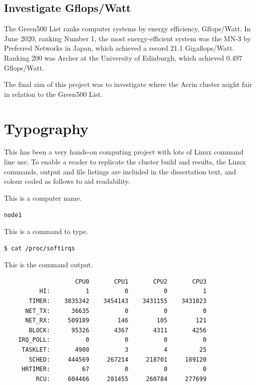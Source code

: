 \documentclass{report}
\begin{document}
%
%
\subsection{Investigate Gflops/Watt}

The Green500 List ranks computer systems by energy efficiency, Gflops/Watt. In June 2020, ranking Number 1, the most energy-efficient system was the MN-3 by Preferred Networks in Japan, which achieved a record 21.1 Gigaflops/Watt. Ranking 200 was Archer at the University of Edinburgh, which achieved 0.497 Gflops/Watt.

The final aim of this project was to investigate where the Aerin cluster might fair in relation to the Green500 List. 


%
%
\section{Typography}

This has been a very hands-on computing project with lots of Linux command line use. To enable a reader to replicate the cluster build and results, the Linux commands, output and file listings are included in the dissertation text, and colour coded as follows to aid readability.

This is a computer name.

\verb|node1|

This is a command to type.

\lstset{style=type}
\begin{lstlisting}[]
$ cat /proc/softirqs
\end{lstlisting}


This is the command output.

\lstset{style=term}
\begin{lstlisting}
                    CPU0       CPU1       CPU2       CPU3       
          HI:          1          0          0          1
       TIMER:    3835342    3454143    3431155    3431023
      NET_TX:      36635          0          0          0
      NET_RX:     509189        146        105        121
       BLOCK:      95326       4367       4311       4256
    IRQ_POLL:          0          0          0          0
     TASKLET:       4900          3          4         25
       SCHED:     444569     267214     218701     189120
     HRTIMER:         67          0          0          0
         RCU:     604466     281455     260784     277699
\end{lstlisting}
\end{document}
